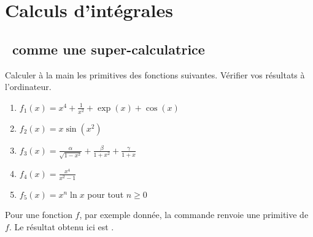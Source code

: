 \documentclass[class=report,crop=false]{standalone}
\begin{document}


\setcounter{section}{6}
\section{Calculs d'intégrales}

\subsection{\Sage\ comme une super-calculatrice}



\begin{tp}
Calculer à la main les primitives des fonctions suivantes. 
Vérifier vos résultats à l'ordinateur.
\begin{enumerate}
  \item $f_1(x) = x^4 + \frac{1}{x^2} + \exp(x)+ \cos(x)$
  \item $f_2(x) = x \sin(x^2)$ 
  \item $f_3(x) = \frac{\alpha}{\sqrt{1-x^2}} + \frac{\beta}{1+x^2} + \frac{\gamma}{1+x}$
  \item $f_4(x) = \frac{x^4}{x^2-1}$ 
  \item $f_5(x) = x^n \ln x$ pour tout $n\ge0$
\end{enumerate}
\end{tp}

Pour une fonction $f$, par exemple  donnée, la commande
 renvoie une primitive de $f$.
Le résultat obtenu ici est .
\end{document}
